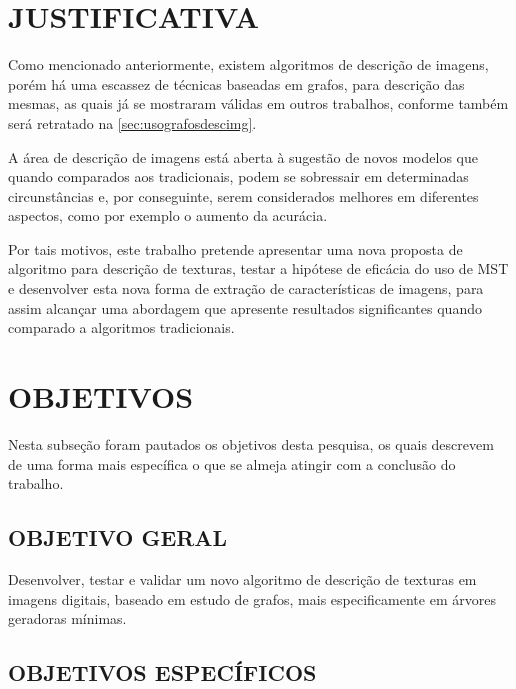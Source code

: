 \section{JUSTIFICATIVA}
\label{sec:justificativa}

\par Como mencionado anteriormente, existem algoritmos de descrição de imagens, porém há uma escassez de técnicas baseadas em grafos, para descrição das mesmas, as quais já se mostraram válidas em outros trabalhos, conforme também será retratado na \autoref{sec:usografosdescimg}.

\par A área de descrição de imagens está aberta à sugestão de novos modelos que quando comparados aos tradicionais, podem se sobressair em determinadas circunstâncias e, por conseguinte, serem considerados melhores em diferentes aspectos, como por exemplo o aumento da acurácia. 

\par Por tais motivos, este trabalho pretende apresentar uma nova proposta de algoritmo para descrição de texturas, testar a hipótese de eficácia do uso de MST e desenvolver esta nova forma de extração de características de imagens, para assim alcançar uma abordagem que apresente resultados significantes quando comparado a algoritmos tradicionais.

\section{OBJETIVOS}
\label{sec:objetivos}

\par Nesta subseção foram pautados os objetivos desta pesquisa, os quais descrevem de uma forma mais específica o que se almeja atingir com a conclusão do trabalho.

\subsection{OBJETIVO GERAL}
\label{subsec:objgerais}

\par Desenvolver, testar e validar um novo algoritmo de descrição de texturas em imagens digitais, baseado em estudo de grafos, mais especificamente em árvores geradoras mínimas. 

\subsection{OBJETIVOS ESPECÍFICOS}
\label{subsec:objespecificos}

